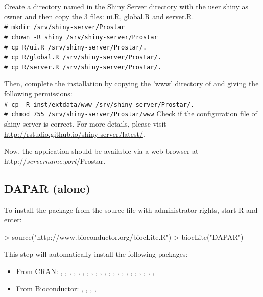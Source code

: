 \documentclass[12pt]{article}
\newcommand{\shellcmd}[1]{\\\indent\indent\texttt{\footnotesize\# #1}}
\begin{document}
Create a directory named  in the Shiny Server directory with the user shiny as owner and then copy the 3 files: ui.R, global.R and server.R.\newline
\shellcmd{mkdir /srv/shiny-server/Prostar}
\shellcmd{chown -R shiny /srv/shiny-server/Prostar}
\shellcmd{cp R/ui.R /srv/shiny-server/Prostar/.}
\shellcmd{cp R/global.R /srv/shiny-server/Prostar/.}
\shellcmd{cp R/server.R /srv/shiny-server/Prostar/.}\newline

Then, complete the installation by copying the 'www' directory of 
 and giving the following permissions:\newline
\shellcmd{cp -R inst/extdata/www /srv/shiny-server/Prostar/.}
\shellcmd{chmod 755 /srv/shiny-server/Prostar/www}\newline
\newline
Check if the configuration file of shiny-server is correct.\newline
For more details, please visit 
\url{http://rstudio.github.io/shiny-server/latest/}.

Now, the application should be available via a web browser at 
http://\emph{servername}:\emph{port}/Prostar.



\subsection{DAPAR (alone)}\label{sec:daparalone}


To install the package  from the source file with administrator 
rights, start R and enter:

\begin{Schunk}
\begin{Sinput}
> source("http://www.bioconductor.org/biocLite.R")
> biocLite("DAPAR")
\end{Sinput}
\end{Schunk}

This step will automatically install the following packages:
\begin{itemize}
\item {From CRAN}: , , , 
, , , , 
, , , ,
, , , ,
, , , 
, , , , 
\item {From Bioconductor}: , , 
, , 
\end{itemize}
\end{document}
